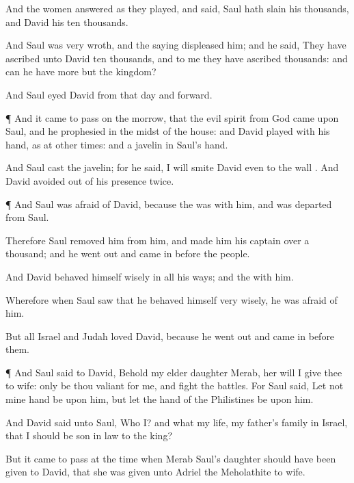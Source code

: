 {And the
women
answered
{} as they
played, and
said,
Saul hath
slain his
thousands, and
David his ten
thousands.

And
Saul was
very
wroth, and the
saying
displeased him; and he
said, They have
ascribed unto
David ten
thousands, and to me they have
ascribed
{}
thousands: and
{} can he have more but the
kingdom?

And
Saul
eyed
David from that
day and
forward.


\par }{\PP {}¶ And it came to pass on the
morrow, that the
evil
spirit from
God
came upon
Saul, and he
prophesied in the
midst of the
house: and
David
played with his
hand, as at other
times: and
{} a
javelin in
Saul’s
hand.

And
Saul
cast the
javelin; for he
said, I will
smite
David even to the
wall
{}. And
David avoided
out of his
presence
twice.


\par }{\PP {}¶ And
Saul was
afraid
of
David, because the
{} was with him, and was
departed from
Saul.

Therefore
Saul
removed him from him, and
made him his
captain over a
thousand; and he went
out and came
in
before the
people.

And
David behaved himself
wisely in all his
ways; and the
{}
{} with him.

Wherefore when
Saul
saw that he
behaved himself
very
wisely, he was
afraid
of him.

But all
Israel and
Judah
loved
David, because he went
out and came
in
before them.


\par }{\PP {}¶ And
Saul
said to
David, Behold my
elder
daughter
Merab, her will I
give thee to
wife: only be thou
valiant for me, and
fight the
{}
battles. For
Saul
said, Let not mine
hand be upon him, but let the
hand of the
Philistines be upon him.

And
David
said unto
Saul, Who
{} I? and what
{} my
life,
{} my
father’s
family in
Israel, that I should be son in
law to the
king?

But it came to pass at the
time when
Merab
Saul’s
daughter should have been
given to
David, that she was
given unto
Adriel the
Meholathite to
wife.

}
